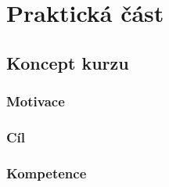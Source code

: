 \part{Praktická část}

\hypertarget{koncept-kurzu}{%
\chapter{Koncept kurzu}\label{koncept-kurzu}}

\hypertarget{motivace}{%
\section{Motivace}\label{motivace}}

\hypertarget{cuxedl}{%
\section{Cíl}\label{cuxedl}}

\hypertarget{kompetence}{%
\section{Kompetence}\label{kompetence}}
